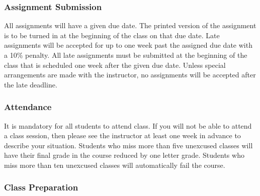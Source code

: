 \vspace*{-.2in}

\subsubsection*{Assignment Submission}

All assignments will have a given due date.  The printed version of the assignment is to be turned in at the beginning
of the class on that due date.  Late assignments will be accepted for up to one week past the assigned due date with a
10\% penalty.  All late assignments must be submitted at the beginning of the class that is scheduled one week after the
given due date.  Unless special arrangements are made with the instructor, no assignments will be accepted after the
late deadline.

\subsubsection*{Attendance}

It is mandatory for all students to attend class.  If you will not be able to attend a class session, then please see
the instructor at least one week in advance to describe your situation.  Students who miss more than five unexcused
classes will have their final grade in the course reduced by one letter grade.  Students who miss more than ten
unexcused classes will automatically fail the course.

\vspace*{-.2in}
\subsubsection*{Class Preparation}

% 


